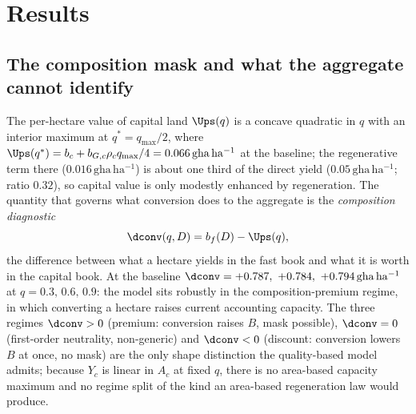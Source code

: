 \section{Results}\label{sec:results}

\subsection{The composition mask and what the aggregate cannot identify}\label{sec:mask}

The per-hectare value of capital land $\Ups(q)$ is a concave quadratic in $q$ with an interior maximum at $q^*=q_{\max}/2$, where $\Ups(q^*)=b_c+b_{G,c}\rho_c q_{\max}/4=0.066\,\mathrm{gha\,ha^{-1}}$ at the baseline; the regenerative term there ($0.016\,\mathrm{gha\,ha^{-1}}$) is about one third of the direct yield ($0.05\,\mathrm{gha\,ha^{-1}}$; ratio $0.32$), so capital value is only modestly enhanced by regeneration. The quantity that governs what conversion does to the aggregate is the \emph{composition diagnostic}
\begin{equation}\label{eq:dconv}
\dconv(q,D)=b_f(D)-\Ups(q),
\end{equation}
the difference between what a hectare yields in the fast book and what it is worth in the capital book. At the baseline $\dconv=+0.787,\ +0.784,\ +0.794\,\mathrm{gha\,ha^{-1}}$ at $q=0.3,\,0.6,\,0.9$: the model sits robustly in the composition-premium regime, in which converting a hectare raises current accounting capacity. The three regimes $\dconv>0$ (premium: conversion raises $B$, mask possible), $\dconv=0$ (first-order neutrality, non-generic) and $\dconv<0$ (discount: conversion lowers $B$ at once, no mask) are the only shape distinction the quality-based model admits; because $Y_c$ is linear in $A_c$ at fixed $q$, there is no area-based capacity maximum and no regime split of the kind an area-based regeneration law would produce.

